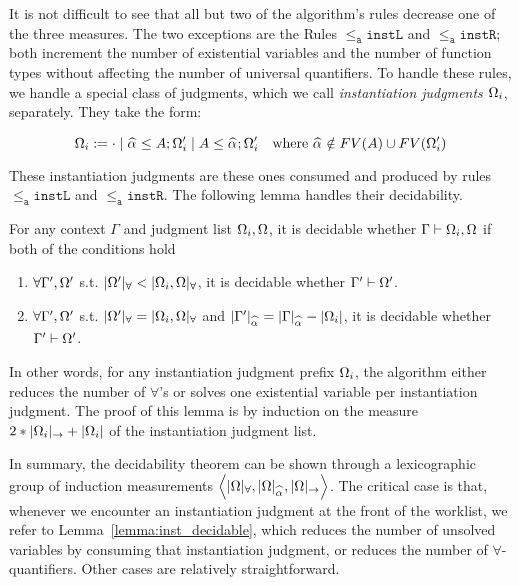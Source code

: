 It is not difficult to see that all but two of the algorithm's rules decrease
one of the three measures. The two exceptions are the Rules $\mathtt{{\le_a}instL}$ and $\mathtt{{\le_a}instR}$; both increment the number of existential
variables and the number of function types without affecting the number of
universal quantifiers.
To handle these rules, we handle a special class of judgments, which
we call \emph{instantiation judgments} $\exps_i$, separately. They 
take the form:
\begin{definition}[$\exps_i$]
$$\exps_i := \cdot \mid \jcons{\al\le A}{\exps_i'} \mid \jcons{A\le \al}{\exps_i'}
\quad\text{where } \al\notin FV(A)\cup FV(\exps_i')$$
\end{definition}
These instantiation judgments are these ones consumed and
produced by rules $\mathtt{{\le_a}instL}$ and $\mathtt{{\le_a}instR}$.
The following lemma handles their decidability.
\begin{lemma}
	For any context $\Gamma$ and judgment list $\Omega_i, \Omega$, it is decidable whether $\Gamma\vdash \Omega_i,\Omega$ if both of the conditions hold
\begin{enumerate}[1)]
	\item $\forall \Gamma', \Omega'$ s.t. $|\Omega'|_\forall < |\Omega_i,\Omega|_\forall$, it is decidable whether $\Gamma'\vdash \Omega'$.
	\item $\forall \Gamma', \Omega'$ s.t. $|\Omega'|_\forall = |\Omega_i,\Omega|_\forall$ and $|\Gamma'|_{\al} = |\Gamma|_{\al} - |\exps_i|$, it is decidable whether $\Gamma'\vdash \Omega'$.
\end{enumerate}
\label{lemma:inst_decidable}
\end{lemma}
In other words, for any instantiation judgment prefix $\exps_i$, the algorithm
either reduces the number of $\forall$'s or solves one existential variable per
instantiation judgment. The proof of this lemma is by induction on the measure
$2*|\Omega_i|_{\to} + |\Omega_i|$ of the instantiation judgment list.

In summary, the decidability theorem can be shown through a lexicographic group
of induction measurements $\left\langle|\Omega|_\forall, |\Omega|_{\al},
|\Omega|_\to\right\rangle$. The critical case is that, whenever we
encounter an instantiation judgment at the front of the worklist, we refer to
Lemma~\ref{lemma:inst_decidable}, which reduces the number of unsolved
variables by consuming that instantiation judgment, or reduces the number of
$\forall$-quantifiers. Other cases are relatively straightforward.
